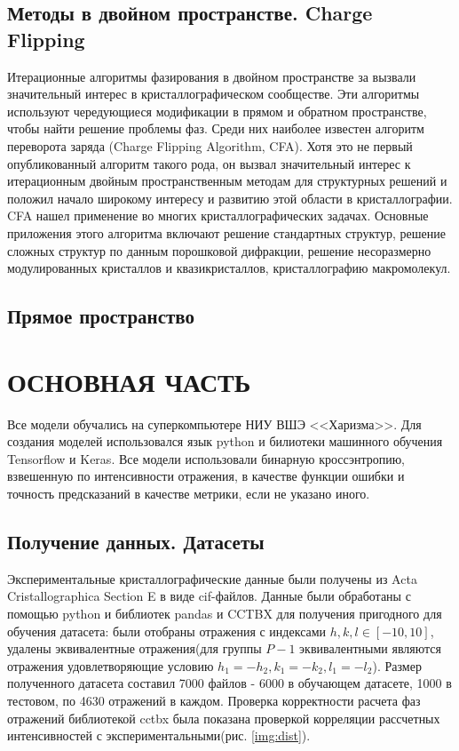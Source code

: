 \documentclass{article}
\begin{document}
\subsection{Методы в двойном пространстве. Charge Flipping}
Итерационные алгоритмы фазирования в двойном пространстве за вызвали значительный интерес в кристаллографическом сообществе. Эти алгоритмы используют чередующиеся модификации в прямом и обратном пространстве, чтобы найти решение проблемы фаз. Среди них наиболее известен алгоритм переворота заряда (Charge Flipping Algorithm, CFA)\cite{ChargeFlipping}. 
Хотя это не первый опубликованный алгоритм такого рода, он вызвал значительный интерес к итерационным двойным пространственным методам для структурных решений и положил начало широкому интересу и развитию этой области в кристаллографии.
CFA нашел применение во многих кристаллографических задачах. Основные приложения этого алгоритма включают решение стандартных структур, решение сложных структур по данным порошковой дифракции, решение несоразмерно модулированных кристаллов и квазикристаллов, кристаллографию макромолекул\cite{Palatinus2013}.


\subsection{Прямое пространство}


\newpage
\section{ОСНОВНАЯ ЧАСТЬ}
Все модели обучались на суперкомпьютере НИУ ВШЭ <<Харизма>>. Для создания моделей использовался язык python и билиотеки машинного обучения Tensorflow и Keras. Все модели использовали бинарную кроссэнтропию, взвешенную по интенсивности отражения, в качестве функции ошибки и точность предсказаний в качестве метрики, если не указано иного.
  
\subsection{Получение данных. Датасеты}
Экспериментальные кристаллографические данные были получены из Acta Cristallographica Section E в виде cif-файлов. Данные были обработаны с помощью python и библиотек pandas и CCTBX для получения пригодного для обучения датасета: были отобраны отражения с индексами $h,k,l \in [-10, 10]$, удалены эквивалентные отражения(для группы $P-1$ эквивалентными являются отражения удовлетворяющие условию $h_1=-h_2, k_1=-k_2, l_1=-l_2$). Размер полученного датасета составил 7000 файлов - 6000 в обучающем датасете, 1000 в тестовом, по 4630 отражений в каждом. Проверка корректности расчета фаз отражений библиотекой cctbx была показана проверкой корреляции рассчетных интенсивностей с экспериментальными(рис. \ref{img:dist}). 
\end{document}

